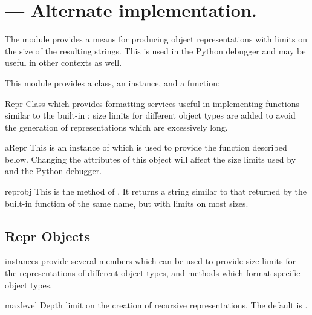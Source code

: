 \section{ ---
         Alternate  implementation.}



The  module provides a means for producing object
representations with limits on the size of the resulting strings.
This is used in the Python debugger and may be useful in other
contexts as well.

This module provides a class, an instance, and a function:


\begin{classdesc}{Repr}{}
  Class which provides formatting services useful in implementing
  functions similar to the built-in ; size limits for 
  different object types are added to avoid the generation of
  representations which are excessively long.
\end{classdesc}


\begin{datadesc}{aRepr}
  This is an instance of  which is used to provide the
   function described below.  Changing the attributes
  of this object will affect the size limits used by 
  and the Python debugger.
\end{datadesc}


\begin{funcdesc}{repr}{obj}
  This is the  method of .  It returns a
  string similar to that returned by the built-in function of the same 
  name, but with limits on most sizes.
\end{funcdesc}


\subsection{Repr Objects \label{Repr-objects}}

 instances provide several members which can be used to
provide size limits for the representations of different object types, 
and methods which format specific object types.


\begin{memberdesc}{maxlevel}
  Depth limit on the creation of recursive representations.  The
  default is .
\end{memberdesc}

